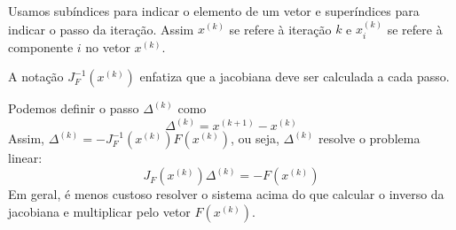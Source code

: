 \begin{obs} Usamos subíndices para indicar o elemento de um vetor e superíndices para indicar o passo da iteração. Assim $x^{(k)}$ se refere à iteração $k$ e $x_i^{(k)}$ se refere à componente $i$ no vetor $x^{(k)}$.
\end{obs}
\begin{obs} A notação $J_F^{-1}\left(x^{(k)}\right)$ enfatiza que a jacobiana deve ser calculada a cada passo.
\end{obs}
\begin{obs} Podemos definir o passo $\Delta^{(k)}$ como
$$\Delta^{(k)}= x^{(k+1)}-x^{(k)}$$
Assim, $\Delta^{(k)}=-J_F^{-1}\left(x^{(k)}\right)F(x^{(k)})$, ou seja, $\Delta^{(k)}$ resolve o problema linear:
$$J_F\left(x^{(k)}\right)\Delta^{(k)}= - F(x^{(k)})$$
Em geral, é menos custoso resolver o sistema acima do que calcular o inverso da jacobiana e multiplicar pelo vetor $F(x^{(k)})$.
\end{obs}


